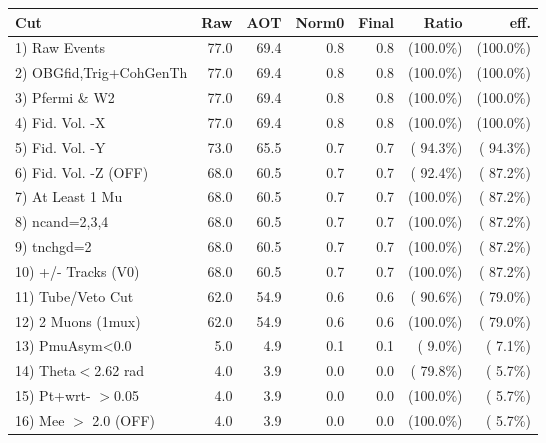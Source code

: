 \begin{table}[h!]\centering
 \begin{tabular}{||l||r|r|r|r|r|r||}
 \hline
 \hline
 Cut & Raw & AOT & Norm0 & Final & Ratio & eff.       \\
 \hline
  1) Raw Events           &         77.0 &         69.4 &          0.8 &          0.8 & (100.0\%) & (100.0\%) \\
  2) OBGfid,Trig+CohGenTh &         77.0 &         69.4 &          0.8 &          0.8 & (100.0\%) & (100.0\%) \\
  3) Pfermi \& W2         &         77.0 &         69.4 &          0.8 &          0.8 & (100.0\%) & (100.0\%) \\
  4) Fid. Vol. -X         &         77.0 &         69.4 &          0.8 &          0.8 & (100.0\%) & (100.0\%) \\
  5) Fid. Vol. -Y         &         73.0 &         65.5 &          0.7 &          0.7 & ( 94.3\%) & ( 94.3\%) \\
  6) Fid. Vol. -Z (OFF)   &         68.0 &         60.5 &          0.7 &          0.7 & ( 92.4\%) & ( 87.2\%) \\
  7) At Least 1 Mu        &         68.0 &         60.5 &          0.7 &          0.7 & (100.0\%) & ( 87.2\%) \\
  8) ncand=2,3,4          &         68.0 &         60.5 &          0.7 &          0.7 & (100.0\%) & ( 87.2\%) \\
  9) tnchgd=2             &         68.0 &         60.5 &          0.7 &          0.7 & (100.0\%) & ( 87.2\%) \\
 10) +/- Tracks (V0)      &         68.0 &         60.5 &          0.7 &          0.7 & (100.0\%) & ( 87.2\%) \\
 11) Tube/Veto Cut        &         62.0 &         54.9 &          0.6 &          0.6 & ( 90.6\%) & ( 79.0\%) \\
 12) 2 Muons (1mux)       &         62.0 &         54.9 &          0.6 &          0.6 & (100.0\%) & ( 79.0\%) \\
 13) PmuAsym<0.0          &          5.0 &          4.9 &          0.1 &          0.1 & (  9.0\%) & (  7.1\%) \\
 14) Theta$<$2.62 rad     &          4.0 &          3.9 &          0.0 &          0.0 & ( 79.8\%) & (  5.7\%) \\
 15) Pt+wrt- $>$0.05      &          4.0 &          3.9 &          0.0 &          0.0 & (100.0\%) & (  5.7\%) \\
 16) Mee $>$ 2.0  (OFF)   &          4.0 &          3.9 &          0.0 &          0.0 & (100.0\%) & (  5.7\%) \\

\end{tabular}
\end{table}
